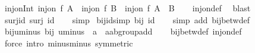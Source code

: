 \begin{isabellebody}
\endisatagproof
{\isafoldproof}%
%
\isadelimproof
\isanewline
%
\endisadelimproof
\isanewline
{}\isamarkupfalse%
\ inj{\isacharunderscore}{\kern0pt}on{\isacharunderscore}{\kern0pt}Int{\isacharcolon}{\kern0pt}\ {\isachardoublequoteopen}inj{\isacharunderscore}{\kern0pt}on\ f\ A\ {\isasymor}\ inj{\isacharunderscore}{\kern0pt}on\ f\ B\ {\isasymLongrightarrow}\ inj{\isacharunderscore}{\kern0pt}on\ f\ {\isacharparenleft}{\kern0pt}A\ {\isasyminter}\ B{\isacharparenright}{\kern0pt}{\isachardoublequoteclose}\isanewline
%
\isadelimproof
\ \ %
\endisadelimproof
%
\isatagproof
{}\isamarkupfalse%
\ inj{\isacharunderscore}{\kern0pt}on{\isacharunderscore}{\kern0pt}def\ \isamarkupfalse%
\ blast%
\endisatagproof
{\isafoldproof}%
%
\isadelimproof
\isanewline
%
\endisadelimproof
\isanewline
{}\isamarkupfalse%
\ surj{\isacharunderscore}{\kern0pt}id{\isacharcolon}{\kern0pt}\ {\isachardoublequoteopen}surj\ id{\isachardoublequoteclose}\isanewline
%
\isadelimproof
\ \ %
\endisadelimproof
%
\isatagproof
{}\isamarkupfalse%
\ simp%
\endisatagproof
{\isafoldproof}%
%
\isadelimproof
\isanewline
%
\endisadelimproof
\isanewline
{}\isamarkupfalse%
\ bij{\isacharunderscore}{\kern0pt}id{\isacharbrackleft}{\kern0pt}simp{\isacharbrackright}{\kern0pt}{\isacharcolon}{\kern0pt}\ {\isachardoublequoteopen}bij\ id{\isachardoublequoteclose}\isanewline
%
\isadelimproof
\ \ %
\endisadelimproof
%
\isatagproof
{}\isamarkupfalse%
\ {\isacharparenleft}{\kern0pt}simp\ add{\isacharcolon}{\kern0pt}\ bij{\isacharunderscore}{\kern0pt}betw{\isacharunderscore}{\kern0pt}def{\isacharparenright}{\kern0pt}%
\endisatagproof
{\isafoldproof}%
%
\isadelimproof
\isanewline
%
\endisadelimproof
\isanewline
{}\isamarkupfalse%
\ bij{\isacharunderscore}{\kern0pt}uminus{\isacharcolon}{\kern0pt}\ {\isachardoublequoteopen}bij\ {\isacharparenleft}{\kern0pt}uminus\ {\isacharcolon}{\kern0pt}{\isacharcolon}{\kern0pt}\ {\isacharprime}{\kern0pt}a\ {\isasymRightarrow}\ {\isacharprime}{\kern0pt}a{\isacharcolon}{\kern0pt}{\isacharcolon}{\kern0pt}ab{\isacharunderscore}{\kern0pt}group{\isacharunderscore}{\kern0pt}add{\isacharparenright}{\kern0pt}{\isachardoublequoteclose}\isanewline
%
\isadelimproof
\ \ %
\endisadelimproof
%
\isatagproof
{}\isamarkupfalse%
\ bij{\isacharunderscore}{\kern0pt}betw{\isacharunderscore}{\kern0pt}def\ inj{\isacharunderscore}{\kern0pt}on{\isacharunderscore}{\kern0pt}def\isanewline
\ \ \isamarkupfalse%
\ {\isacharparenleft}{\kern0pt}force\ intro{\isacharcolon}{\kern0pt}\ minus{\isacharunderscore}{\kern0pt}minus\ {\isacharbrackleft}{\kern0pt}symmetric{\isacharbrackright}{\kern0pt}{\isacharparenright}{\kern0pt}%

\end{isabellebody}
